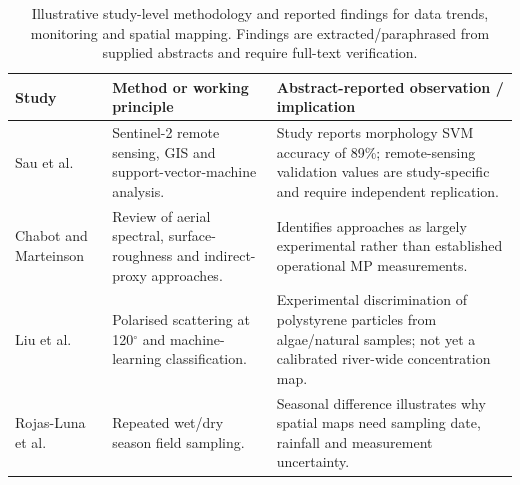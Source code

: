 \documentclass[10pt,a4paper]{article}
\begin{document}
\begin{table}[H]\centering\scriptsize
\caption{Illustrative study-level methodology and reported findings for data trends, monitoring and spatial mapping. Findings are extracted/paraphrased from supplied abstracts and require full-text verification.}
\begin{tabularx}{\linewidth}{@{}p{2.8cm}XX@{}}\toprule Study & Method or working principle & Abstract-reported observation / implication \\ \midrule
Sau et al. \cite{MPWE02100} & Sentinel-2 remote sensing, GIS and support-vector-machine analysis. & Study reports morphology SVM accuracy of 89\%; remote-sensing validation values are study-specific and require independent replication. \\[2pt]
Chabot and Marteinson \cite{MPWE04211} & Review of aerial spectral, surface-roughness and indirect-proxy approaches. & Identifies approaches as largely experimental rather than established operational MP measurements. \\[2pt]
Liu et al. \cite{MPWE01416} & Polarised scattering at 120$^\circ$ and machine-learning classification. & Experimental discrimination of polystyrene particles from algae/natural samples; not yet a calibrated river-wide concentration map. \\[2pt]
Rojas-Luna et al. \cite{MPWE00090} & Repeated wet/dry season field sampling. & Seasonal difference illustrates why spatial maps need sampling date, rainfall and measurement uncertainty. \\[2pt]
\bottomrule\end{tabularx}\end{table}
\clearpage
\end{document}

